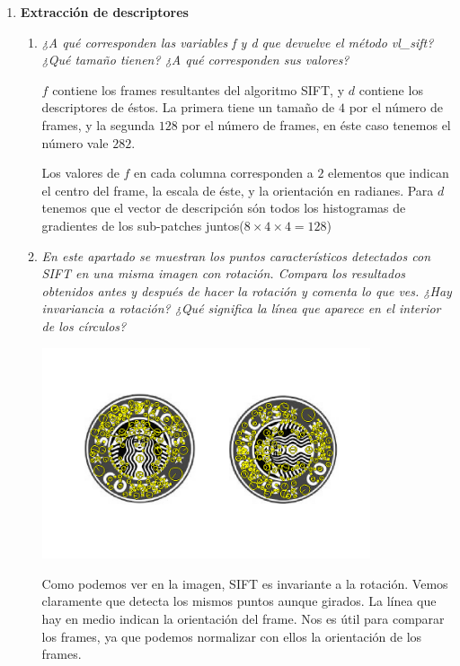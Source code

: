 \documentclass{article}
\begin{document}
\begin{enumerate}
\begin{enumerate}
 \end{enumerate}

\newpage

 \item \textbf{ Extracción de descriptores } 
 
 \begin{enumerate}
 \item \textit{¿A  qué  corresponden  las  variables f y  d que  devuelve  el método  vl\_sift? ¿Qué tamaño tienen? ¿A qué corresponden sus valores?}  
 
 $f$ contiene los frames resultantes del algoritmo SIFT, y $d$ contiene los descriptores de éstos. La primera tiene un tamaño de $4$ por el número de frames, y la segunda $128$ por el número de frames, en éste caso tenemos el número vale $282$.
 
 Los valores de $f$ en cada columna corresponden a $2$ elementos que indican el centro del frame, la escala de éste, y la orientación en radianes. Para $d$ tenemos que el vector de descripción són todos los histogramas de gradientes de los sub-patches juntos($8 \times 4 \times 4 = 128$)
 
 \item \textit{En  este  apartado  se muestran  los  puntos  característicos  detectados  con SIFT  en  una  misma  imagen  con  rotación.  Compara  los  resultados 
obtenidos antes y después de hacer la rotación y comenta lo que ves. ¿Hay 
invariancia a rotación? ¿Qué significa la línea que aparece en el interior de 
los círculos?}

\begin{center}
	\includegraphics[width=0.8\textwidth]{ej34b.png}
\end{center}

Como podemos ver en la imagen, SIFT es invariante a la rotación. Vemos claramente que detecta los mismos puntos aunque girados. La línea que hay en medio indican la orientación del frame. Nos es útil para comparar los frames, ya que podemos normalizar con ellos la orientación de los frames.


\end{enumerate}
\end{enumerate}
\end{document}
